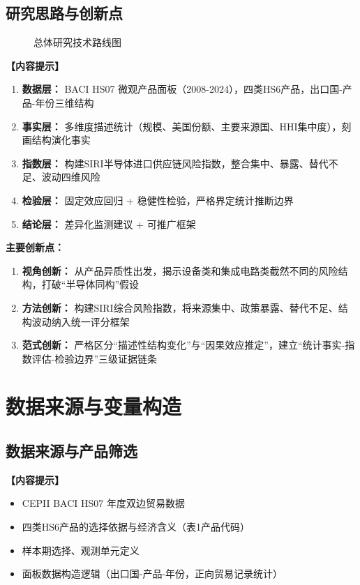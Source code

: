 \documentclass[UTF8,a4paper,12pt]{ctexart}
\begin{document}
\subsection{研究思路与创新点}

\begin{figure}[H]
    \centering
    \caption{总体研究技术路线图}
    \label{fig:framework}
\end{figure}

\noindent\textbf{【内容提示】}
\begin{enumerate}[nosep]
    \item \textbf{数据层：} BACI HS07 微观产品面板（2008-2024），四类HS6产品，出口国-产品-年份三维结构
    \item \textbf{事实层：} 多维度描述统计（规模、美国份额、主要来源国、HHI集中度），刻画结构演化事实
    \item \textbf{指数层：} 构建SIRI半导体进口供应链风险指数，整合集中、暴露、替代不足、波动四维风险
    \item \textbf{检验层：} 固定效应回归 + 稳健性检验，严格界定统计推断边界
    \item \textbf{结论层：} 差异化监测建议 + 可推广框架
\end{enumerate}

\noindent\textbf{主要创新点：}
\begin{enumerate}[nosep]
    \item \textbf{视角创新：} 从产品异质性出发，揭示设备类和集成电路类截然不同的风险结构，打破“半导体同构”假设
    \item \textbf{方法创新：} 构建SIRI综合风险指数，将来源集中、政策暴露、替代不足、结构波动纳入统一评分框架
    \item \textbf{范式创新：} 严格区分“描述性结构变化”与“因果效应推定”，建立“统计事实-指数评估-检验边界”三级证据链条
\end{enumerate}

\section{数据来源与变量构造}

\subsection{数据来源与产品筛选}
\noindent\textbf{【内容提示】}
\begin{itemize}[nosep]
    \item CEPII BACI HS07 年度双边贸易数据
    \item 四类HS6产品的选择依据与经济含义（表1产品代码）
    \item 样本期选择、观测单元定义
    \item 面板数据构造逻辑（出口国-产品-年份，正向贸易记录统计）
\end{itemize}
\end{document}
